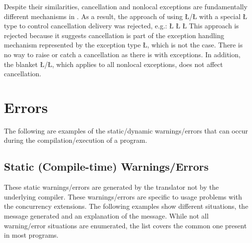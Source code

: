 \documentclass[openright,twoside]{report}
\begin{document}
Despite their similarities, cancellation and nonlocal exceptions are fundamentally different mechanisms in \uC.
As a result, the approach of using \LGinlinetrue\LGbegin\lgrinde\L{}\endlgrinde\LGend{}/\LGinlinetrue\LGbegin\lgrinde\L{}\endlgrinde\LGend{} with a special \LGinlinetrue\LGbegin\lgrinde\L{}\endlgrinde\LGend{} type to control cancellation delivery was rejected, e.g.:
\LGinlinefalse\LGbegin\lgrinde
\L{}
\L{\LB{}}
\L{\LB{\}}}
\endlgrinde\LGend
This approach is rejected because it suggests cancellation is part of the exception handling mechanism represented by the exception type \LGinlinetrue\LGbegin\lgrinde\L{}\endlgrinde\LGend{}, which is not the case.
There is no way to raise or catch a cancellation as there is with exceptions.
In addition, the blanket \LGinlinetrue\LGbegin\lgrinde\L{}\endlgrinde\LGend{}/\LGinlinetrue\LGbegin\lgrinde\L{}\endlgrinde\LGend{}, which applies to all nonlocal exceptions, does not affect cancellation.


\chapter{Errors}
\label{s:Errors}

The following are examples of the static/dynamic warnings/errors that can occur during the compilation/execution of a \uC program.


\section{Static (Compile-time) Warnings/Errors}

These static warnings/errors are generated by the \uC translator not by the underlying \CC compiler.
These warnings/errors are specific to usage problems with the \uC concurrency extensions.
The following examples show different situations, the message generated and an explanation of the message.
While not all warning/error situations are enumerated, the list covers the common one present in most \uC programs.
\end{document}
